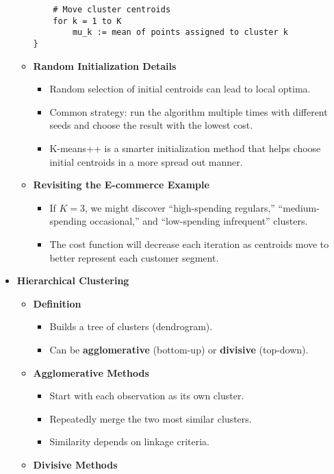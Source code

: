 \documentclass[10pt]{article}
\begin{document}
\begin{itemize}
\begin{itemize}
\begin{verbatim}
    # Move cluster centroids
    for k = 1 to K
        mu_k := mean of points assigned to cluster k
}
        \end{verbatim}
        \item \textbf{Random Initialization Details}
        \begin{itemize}
            \item Random selection of initial centroids can lead to local optima.
            \item Common strategy: run the algorithm multiple times with different seeds and choose the result with the lowest cost.
            \item K-means++ is a smarter initialization method that helps choose initial centroids in a more spread out manner.
        \end{itemize}
        \item \textbf{Revisiting the E-commerce Example}
        \begin{itemize}
            \item If $K=3$, we might discover “high-spending regulars,” “medium-spending occasional,” and “low-spending infrequent” clusters.
            \item The cost function will decrease each iteration as centroids move to better represent each customer segment.
        \end{itemize}
    \end{itemize}
    \item \textbf{Hierarchical Clustering}
    \begin{itemize}
        \item \textbf{Definition}
        \begin{itemize}
            \item Builds a tree of clusters (dendrogram).
            \item Can be \textbf{agglomerative} (bottom-up) or \textbf{divisive} (top-down).
        \end{itemize}
        \item \textbf{Agglomerative Methods}
        \begin{itemize}
            \item Start with each observation as its own cluster.
            \item Repeatedly merge the two most similar clusters.
            \item Similarity depends on linkage criteria.
        \end{itemize}
        \item \textbf{Divisive Methods}

\end{itemize}
\end{itemize}
\end{document}
